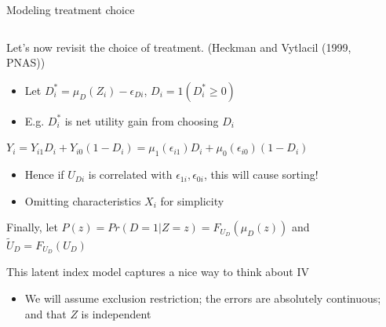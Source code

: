 \documentclass[notes,11pt, aspectratio=169]{beamer}
\newenvironment{wideitemize}{\itemize\addtolength{\itemsep}{10pt}}{\enditemize}
\begin{document}
\begin{frame}{Modeling treatment choice}
  \begin{columns}[T] %
    \begin{column}{0.95\textwidth}
      \begin{wideitemize}
      \item Let's now revisit the choice of treatment. (Heckman and Vytlacil (1999, PNAS))
        \begin{itemize}
        \item Let $D_{i}^{*} = \mu_{D}(Z_{i}) - \epsilon_{Di}$, $D_{i} = 1(D_{i}^{*} \ge 0)$
          \item E.g. $D_{i}^{*}$ is net utility gain from choosing $D_{i}$
          \end{itemize}
        \item $Y_{i} = Y_{i1}D_{i} + Y_{i0}(1-D_{i}) = \mu_{1}(\epsilon_{i1})D_{i} + \mu_{0}(\epsilon_{i0})(1-D_{i})$
          \begin{itemize}
          \item Hence if $U_{Di}$ is correlated with
            $ \epsilon_{1i},\epsilon_{0i}$, this will cause sorting!
          \item Omitting characteristics $X_{i}$ for simplicity
          \end{itemize}
        \item Finally, let $P(z) = Pr(D = 1 | Z = z) = F_{U_{D}}(\mu_{D}(z))$ and $\tilde{U}_{D} = F_{U_{D}}(U_{D})$
        \item This latent index model captures a nice way to think about IV
          \begin{itemize}
          \item We will assume exclusion restriction; the errors are
            absolutely continuous; and that $Z$ is independent
          \end{itemize}
      \end{wideitemize}
\end{column}
\begin{column}{0.4\textwidth}
\end{column}
\end{columns}
\end{frame}
\end{document}
